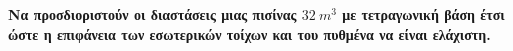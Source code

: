 




\pagestyle{askhseis}
\everymath{\displaystyle}
\usepackage{wrapfig}



\begin{center}
  \minibox{\large \bfseries \textcolor{Col1}{Προβλήματα Ακροτάτων}}
\end{center}

\vspace{\baselineskip}

\begin{exercise}
  {\bfseries \boldmath Να προσδιοριστούν οι διαστάσεις μιας πισίνας 
    $ \SI{32}{m^{3}} $ με τετραγωνική βάση έτσι ώστε η επιφάνεια των εσωτερικών 
  τοίχων και του πυθμένα να είναι ελάχιστη.}
\end{exercise}
